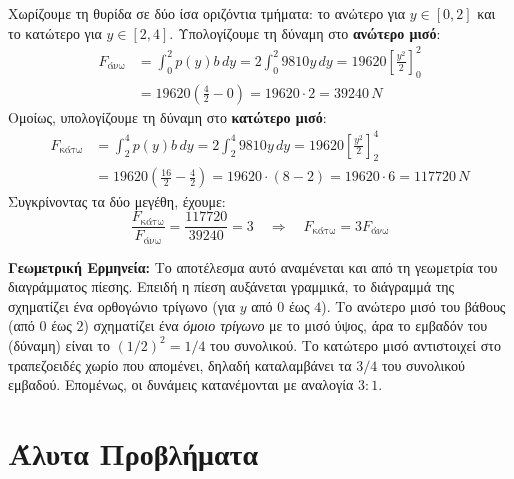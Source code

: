 \begin{alist}
\item Χωρίζουμε τη θυρίδα σε δύο ίσα οριζόντια τμήματα: το ανώτερο για $y \in [0,2]$ και το κατώτερο για $y \in [2,4]$.
Υπολογίζουμε τη δύναμη στο \textbf{ανώτερο μισό}:
\begin{align*}
    F_{\text{άνω}} &= \int_0^2 p(y)b\,dy = 2 \int_0^2 9810y\,dy = 19620 \left[ \frac{y^2}{2} \right]_0^2 \\
                   &= 19620 \left( \frac{4}{2} - 0 \right) = 19620 \cdot 2 = 39240\,\si{N}
\end{align*}
Ομοίως, υπολογίζουμε τη δύναμη στο \textbf{κατώτερο μισό}:
\begin{align*}
    F_{\text{κάτω}} &= \int_2^4 p(y)b\,dy = 2 \int_2^4 9810y\,dy = 19620 \left[ \frac{y^2}{2} \right]_2^4 \\
                    &= 19620 \left( \frac{16}{2} - \frac{4}{2} \right) = 19620 \cdot (8 - 2) = 19620 \cdot 6 = 117720\,\si{N}
\end{align*}
Συγκρίνοντας τα δύο μεγέθη, έχουμε:
\[\frac{F_{\text{κάτω}}}{F_{\text{άνω}}} = \frac{117720}{39240} = 3 \quad \Rightarrow \quad F_{\text{κάτω}} = 3F_{\text{άνω}}\]

\textbf{Γεωμετρική Ερμηνεία:} 
Το αποτέλεσμα αυτό αναμένεται και από τη γεωμετρία του διαγράμματος πίεσης. Επειδή η πίεση αυξάνεται γραμμικά, το διάγραμμά της σχηματίζει ένα ορθογώνιο τρίγωνο (για $y$ από $0$ έως $4$). Το ανώτερο μισό του βάθους (από $0$ έως $2$) σχηματίζει ένα \emph{όμοιο τρίγωνο} με το μισό ύψος, άρα το εμβαδόν του (δύναμη) είναι το $(1/2)^2 = 1/4$ του συνολικού. Το κατώτερο μισό αντιστοιχεί στο τραπεζοειδές χωρίο που απομένει, δηλαδή καταλαμβάνει τα $3/4$ του συνολικού εμβαδού. Επομένως, οι δυνάμεις κατανέμονται με αναλογία $3:1$.
\end{alist}

\section{Άλυτα Προβλήματα}

